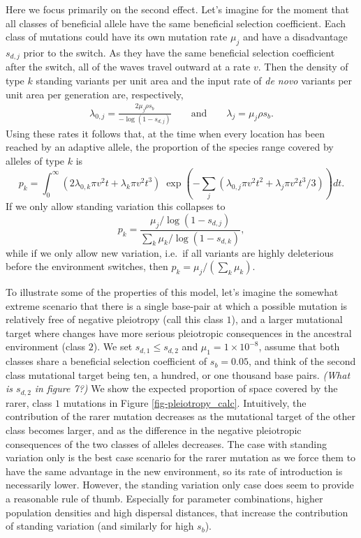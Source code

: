 \documentclass{article}
\newcommand{\plr}[1]{{\it\color{blue}(#1)}}
\begin{document}
Here we focus primarily on the second effect. 
Let's imagine for the moment that all classes of beneficial allele 
have the same beneficial selection coefficient. 
Each class of mutations could have its own mutation rate $\mu_j$ and
have a disadvantage $s_{d,j}$ prior to the switch. 
As they have the same beneficial selection coefficient after the switch, 
all of the waves travel outward at a rate $v$. 
Then the density of type $k$ standing variants per unit area 
and the input rate of \textit{de novo} variants per unit area per generation are, respectively,
\begin{align}
  \lambda_{0,j} = \frac{ 2 \mu_j \rho s_b }{ -\log(1-s_{d,j}) } \qquad \text{and} \qquad    \lambda_{j} = \mu_j \rho s_b .
\end{align}
Using these rates it follows that, at the time when every location has been reached by an adaptive allele,
the proportion of the species range covered by alleles of type $k$ is
\begin{equation} \label{eqn-prop-space-allele-k}
    p_k = \int_0^\infty  \left( 2 \lambda_{0,k} \pi v^2 t + \lambda_k \pi v^2 t^3 \right)  
    \; \exp \left( - \sum_j ( \lambda_{0,j} \pi v^2 t^2 + \lambda_j \pi v^2 t^3 / 3 ) \right) dt .
\end{equation}
If we only allow standing variation this collapses to 
\begin{equation}  \label{eqn-prop-space-allele-k-standing-room-only}
    p_k = \frac{  \mu_j / \log(1-s_{d,j}) }{\sum_k  \mu_k / \log(1-s_{d,k}) } ,
\end{equation}
while if we only allow new variation, 
i.e.\ if all variants are highly deleterious before the environment switches, 
then $p_k =\mu_j / (\sum_k  \mu_k)$.

To illustrate some of the properties of this model, 
let's imagine the somewhat extreme scenario that there is a single base-pair 
at which a possible mutation is relatively free of negative pleiotropy (call this class $1$), 
and a larger mutational target where changes 
have more serious pleiotropic consequences in the ancestral environment (class $2$). 
We set $s_{d,1} \leq s_{d,2}$ and $\mu_1=1 \times 10^{-8}$, 
assume that both classes share a beneficial selection coefficient of $s_b=0.05$,
and think of the second class mutational target being ten, a hundred, or one thousand base pairs. 
\plr{What is $s_{d,2}$ in figure 7?}
We show the expected proportion of space covered by
the rarer, class $1$ mutations in Figure \ref{fig-pleiotropy_calc}.
Intuitively, the contribution of the rarer mutation decreases as the
mutational target of the other class becomes larger, and as the
difference in the negative pleiotropic consequences of the two classes of alleles decreases. 
The case with standing variation only is the best case scenario 
for the rarer mutation as we force them to have the same advantage in the new environment, 
so its rate of introduction is necessarily lower. 
However, the standing variation only case does seem to provide a reasonable rule of thumb. 
Especially for parameter combinations, 
higher population densities and high dispersal distances, 
that increase the contribution of standing variation (and similarly for high $s_b$). 
\end{document}
